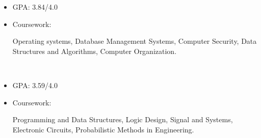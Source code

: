\newcommand{\TUBentry}{
    \TUB
    \poswithprd{Introduction to 3D Scanning and Printing at TUB Winter University}{Jan 2018-Feb 2018}
    \begin{itemize}
        \item 
        Learned the basic of 3D scanning \& printing. Learned Blender for 3D modeling.
    \end{itemize}
}



\UM
{}
\begin{itemize}
    \item GPA: 3.84/4.0
    \item Coursework: 
    \begin{minipage}[t]{\courseworkwidth}
        Operating systems,
        Database Management Systems,
        Computer Security,
        Data Structures and Algorithms,
        Computer Organization.
    \end{minipage}\\
\end{itemize}

\JI
{}
\begin{itemize}
    \item GPA: 3.59/4.0
    \item Coursework:
    \begin{minipage}[t]{\courseworkwidth}
        Programming and Data Structures,
        Logic Design,
        Signal and Systems,
        Electronic Circuits,
        Probabilistic Methods in Engineering.
    \end{minipage}\\
\end{itemize}